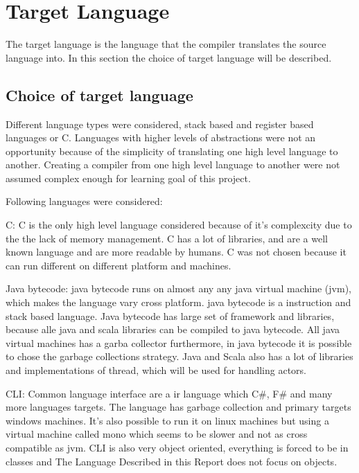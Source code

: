 \section{Target Language}
\label{sec:targetLanguage}

The target language is the language that the compiler translates the source language into. In this section the choice of target language will be described. %

\subsection{Choice of target language}

Different language types were considered, stack based and register based languages or C. %
Languages with higher levels of abstractions were not an opportunity because of the simplicity of translating one high level language to another. %
Creating a compiler from one high level language to another were not assumed complex enough for learning goal of this project. 

Following languages were considered:

C:
C is the only high level language considered because of it's complexcity due to the the lack of memory management. C has a lot of libraries, and are a well known language and are more readable by humans. C was not chosen because it can run different on different platform and machines. %

Java bytecode: 
java bytecode runs on almost any any java virtual machine (jvm), which makes the language vary cross platform. java bytecode is a instruction and stack based language. Java bytecode has large set of framework and libraries, because alle java and scala libraries can be compiled to java bytecode. All java virtual machines has a garba collector furthermore, in java bytecode it is possible to chose the garbage collections strategy.
Java and Scala also has a lot of libraries and implementations of thread, which will be used for handling actors.

CLI:
Common language interface are a ir language which C\#, F\# and many more languages targets. The language has garbage collection and primary targets windows machines.  It’s also possible to run it on linux machines but using a virtual machine called mono which seems to be slower and not as cross compatible as jvm. 
CLI is also very object oriented, everything is forced to be in classes and The Language Described in this Report does not focus on objects. 

